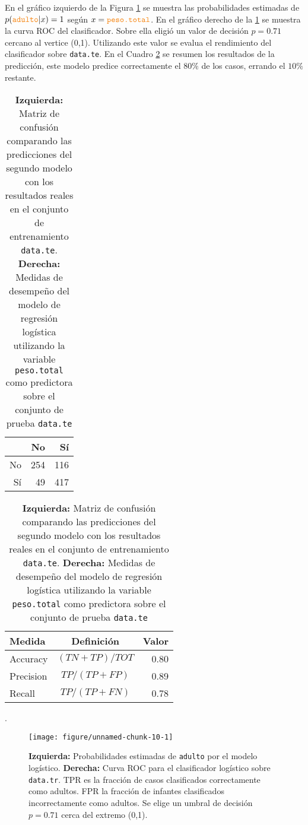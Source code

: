 \documentclass[a4paper]{article}\usepackage[]{graphicx}\usepackage[]{color}
\makeatletter
\def\maxwidth{ %
  \ifdim\Gin@nat@width>\linewidth
    \linewidth
  \else
    \Gin@nat@width
  \fi
}
\newenvironment{knitrout}{}{} %
\makeatother
\begin{document}
En el gráfico izquierdo de la Figura \ref{fig:model2} se muestra las probabilidades estimadas de $p(\texttt{\textcolor{BurntOrange}{adulto}}|x)=1$ según $x=\texttt{\textcolor{BurntOrange}{peso.total}}$. En el gráfico derecho de la \ref{fig:model2} se muestra la curva ROC del clasificador. Sobre ella eligió un valor de decisión $p=0.71$ cercano al vertice (0,1). Utilizando este valor se evalua el rendimiento del clasificador sobre \texttt{\textcolor{BurntOrange}{data.te}}. En el Cuadro \ref{tab:medidas2} se resumen los resultados de la predicción, este modelo predice correctamente el $80\%$ de los casos, errando el $10\%$ restante.



\begin{table}[b]
\centering
\begin{tabular}{rrr}
  \hline
 & No & Sí \\ 
  \hline
No & 254 & 116 \\ 
  Sí &  49 & 417 \\ 
   \hline
\end{tabular}
\hspace{4cm}
\begin{tabular}{l c r}
\hline
Medida 				& Definición		& Valor\\
\hline
Accuracy 			& $(TN+TP)/TOT$ & 0.80\\
Precision 			& $TP/(TP+FP)$  & 0.89 \\
Recall 				& $TP/(TP+FN)$  & 0.78\\
\hline
\end{tabular}
\caption{\textbf{Izquierda:} Matriz de confusión comparando las predicciones del segundo modelo con los resultados reales en el conjunto de entrenamiento \texttt{\textcolor{BurntOrange}{data.te}}. \textbf{Derecha:} Medidas de desempeño del modelo de regresión logística utilizando la variable \texttt{\textcolor{BurntOrange}{peso.total}} como predictora sobre el conjunto de prueba \texttt{\textcolor{BurntOrange}{data.te}}}.
\label{tab:medidas2}
\end{table}


\begin{figure}[H]
\begin{knitrout}
\color{fgcolor}

{\centering \texttt{[image: figure/unnamed-chunk-10-1]} 

}



\end{knitrout}
\caption{\textbf{Izquierda:} Probabilidades estimadas de \texttt{\textcolor{BurntOrange}{adulto}} por el modelo logístico. \textbf{Derecha:} Curva ROC para el clasificador logístico sobre \texttt{\textcolor{BurntOrange}{data.tr}}. TPR es la fracción de casos clasificados correctamente como adultos. FPR la fracción de infantes clasificados incorrectamente como adultos. Se elige un umbral de decisión $p=0.71$ cerca del extremo (0,1).}
\label{fig:model2}
\end{figure}
\end{document}
